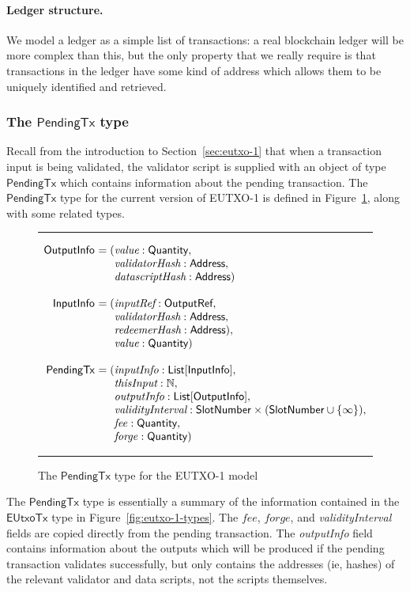 \documentclass[a4paper]{article}
\renewcommand{\i}{\textit}  %
\newcommand{\s}{\textsf}  %
\newenvironment{arraydefs}[1]{\setlength{\arraycolsep}{0pt}\begin{array}{#1}}{\end{array}}
\newcommand\rfskip{7pt}
\newenvironment{ruledfigure}[1]{\begin{figure}[#1]\hrule\vspace{\rfskip}}{\vspace{\rfskip}\hrule\end{figure}}
\newcommand{\List}[1]{\ensuremath{\s{List}[#1]}}
\newcommand{\ptx}{\ensuremath{\s{PendingTx}}}
\newcommand{\mi}[1]{\ensuremath{\mathit{#1}}}
\newcommand{\forge}{\mi{forge}}
\newcommand{\fee}{\mi{fee}}
\newcommand{\msf}[1]{\ensuremath{\mathsf{#1}}}
\newcommand{\slotnum}{\msf{SlotNumber}}
\newcommand{\eutxotx}{\msf{EUtxoTx}}
\newcommand{\qty}{\ensuremath{\s{Quantity}}}
\newcommand\N{\ensuremath{\mathbb{N}}}
\begin{document}
\paragraph{Ledger structure.} We model a ledger as a simple
list of transactions: a real blockchain ledger will be more complex
than this, but the only property that we really require is that
transactions in the ledger have some kind of address which allows them
to be uniquely identified and retrieved.

\subsubsection{The $\ptx$ type}
\label{sec:pendingtx}
Recall from the introduction to Section~\ref{sec:eutxo-1} that when a
transaction input is being validated, the validator script is supplied
with an object of type $\ptx$ which contains information about the
pending transaction.  The $\ptx$ type for the current version of
EUTXO-1 is defined in Figure~\ref{fig:ptx-1-types}, along with some
related types.

\begin{ruledfigure}{H}
  \[
  \begin{arraydefs}{rll}
    
    \s{OutputInfo } &= (& \i{value}: \qty,\\
    && \i{validatorHash}: \s{Address},\\
    &&  \i{datascriptHash}: \s{Address})\\
    \\
    \s{InputInfo } & = (&\i{inputRef}: \s{OutputRef},\\
                 && \i{validatorHash}: \s{Address},\\
                 && \i{redeemerHash}: \s{Address}),\\
                 && \i{value}: \qty)\\
     \\
     \ptx\s{ } &= (&\i{inputInfo}: \List{\s{InputInfo}},\\
     &&\i{thisInput}: \N,\\
     &&\i{outputInfo}: \List{\s{OutputInfo}},\\
     &&\i{validityInterval}: \slotnum \times (\slotnum \cup \{\infty\}),\\
     && \fee: \qty,\\
     &&\forge: \qty)
   \end{arraydefs}
 \]
  \caption{The $\ptx$ type for the EUTXO-1 model}
  \label{fig:ptx-1-types}
\end{ruledfigure}
\noindent The $\ptx$ type is essentially a summary of the information
contained in the $\eutxotx$ type in
Figure~\ref{fig:eutxo-1-types}. The \fee, \forge, and
\i{validityInterval} fields are copied directly from the pending
transaction.  The \i{outputInfo} field contains information about the
outputs which will be produced if the pending transaction validates
successfully, but only contains the addresses (ie, hashes) of the
relevant validator and data scripts, not the scripts themselves.
\end{document}
